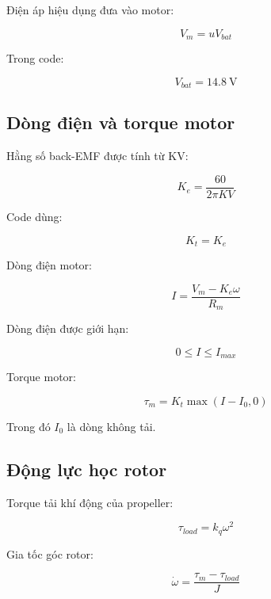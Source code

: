 Điện áp hiệu dụng đưa vào motor:

\begin{equation}
    V_m = uV_{bat}
\end{equation}

Trong code:

\begin{equation}
    V_{bat}=14.8\ \mathrm{V}
\end{equation}

\subsection{Dòng điện và torque motor}

Hằng số back-EMF được tính từ KV:

\begin{equation}
    K_e = \frac{60}{2\pi KV}
\end{equation}

Code dùng:

\begin{equation}
    K_t = K_e
\end{equation}

Dòng điện motor:

\begin{equation}
    I
    =
    \frac{V_m-K_e\omega}{R_m}
\end{equation}

Dòng điện được giới hạn:

\begin{equation}
    0 \leq I \leq I_{max}
\end{equation}

Torque motor:

\begin{equation}
    \tau_m
    =
    K_t \max(I-I_0,0)
\end{equation}

Trong đó $I_0$ là dòng không tải.

\subsection{Động lực học rotor}

Torque tải khí động của propeller:

\begin{equation}
    \tau_{load}
    =
    k_q\omega^2
\end{equation}

Gia tốc góc rotor:

\begin{equation}
    \dot{\omega}
    =
    \frac{\tau_m-\tau_{load}}{J}
\end{equation}

